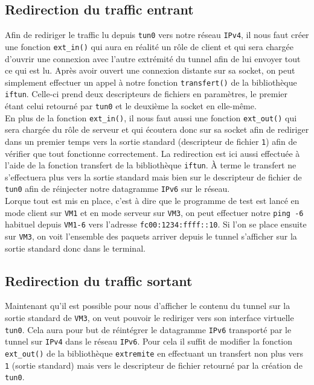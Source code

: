\documentclass[a4paper, 12pt]{article}
\begin{document}
\begin{spacing}{1.1}
    \subsection{Redirection du traffic entrant}

    Afin de rediriger le traffic lu depuis \verb+tun0+ vers notre réseau 
    \verb+IPv4+, il nous faut créer une fonction \verb+ext_in()+ qui aura en 
    réalité un rôle de client et qui sera chargée d'ouvrir une connexion avec 
    l'autre extrémité du tunnel afin de lui envoyer tout ce qui est lu. Après 
    avoir ouvert une connexion distante sur sa socket, on peut simplement 
    effectuer un appel à notre fonction \verb+transfert()+ de la bibliothèque 
    \verb+iftun+. Celle-ci prend deux descripteurs de fichiers en paramètres, 
    le premier étant celui retourné par \verb+tun0+ et le deuxième la socket 
    en elle-même. \\

    En plus de la fonction \verb+ext_in()+, il nous faut aussi une fonction 
    \verb+ext_out()+ qui sera chargée du rôle de serveur et qui écoutera donc
    sur sa socket afin de rediriger dans un premier temps vers la sortie 
    standard (descripteur de fichier \verb+1+) afin de vérifier que tout fonctionne 
    correctement. La redirection est ici aussi effectuée à l'aide de la 
    fonction transfert de la bibliothèque \verb+iftun+. À terme le transfert ne
    s'effectuera plus vers la sortie standard mais bien sur le descripteur de 
    fichier de \verb+tun0+ afin de réinjecter notre datagramme \verb+IPv6+ sur
    le réseau. \\

    Lorque tout est mis en place, c'est à dire que le programme de test est
    lancé en mode client sur \verb+VM1+ et en mode serveur sur \verb+VM3+, on
    peut effectuer notre \verb+ping -6+ habituel depuis \verb+VM1-6+ vers 
    l'adresse \verb+fc00:1234:ffff::10+. Si l'on se place ensuite sur 
    \verb+VM3+, on voit l'ensemble des paquets arriver depuis le tunnel 
    s'afficher sur la sortie standard donc dans le terminal.

    \subsection{Redirection du traffic sortant}

    Maintenant qu'il est possible pour nous d'afficher le contenu du tunnel
    sur la sortie standard de \verb+VM3+, on veut pouvoir le rediriger vers son
    interface virtuelle \verb+tun0+. Cela aura pour but de réintégrer le 
    datagramme \verb+IPv6+ transporté par le tunnel sur \verb+IPv4+ dans le 
    réseau \verb+IPv6+. Pour cela il suffit de modifier la fonction 
    \verb+ext_out()+ de la bibliothèque \verb+extremite+ en effectuant un 
    transfert non plus vers \verb+1+ (sortie standard) mais vers le descripteur 
    de fichier retourné par la création de \verb+tun0+. \\


\end{spacing}
\end{document}
